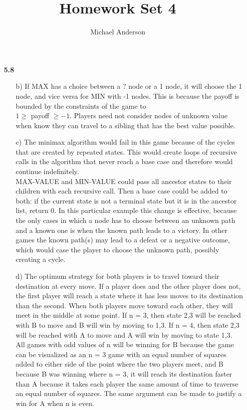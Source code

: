 \documentclass{article}
\author{Michael Anderson}
\title{Homework Set 4}
\begin{document}
\begin{enumerate}
\item[\textbf{5.8}]

\begin{enumerate}
\item[b)]
If MAX has a choice between a ? node or a 1 node, it will choose the 1 node,
and vice versa for MIN with -1 nodes. This is because the payoff is bounded by
the constraints of the game to \\ $1\ge$ payoff $\ge -1$. Players need not
consider nodes of unknown value when know they can travel to a sibling that has
the best value possible.
\item[c)]
The minimax algorithm would fail in this game because of the cycles that are
created by repeated states. This would create loops of recursive calls in the
algorithm that never reach a base case and therefore would continue
indefinitely. \\

MAX-VALUE and MIN-VALUE could pass all ancestor states to their
children with each recursive call. Then a base case could be added to both: if
the current state is not a terminal state but it is in the ancestor list,
return 0. In this particular example this change is effective, because the only
cases in which a node has to choose between an unknown path and a known one is
when the known path leads to a victory. In other games the known path(s) may
lead to a defeat or a negative outcome, which would case the player to choose
the unknown path, possibly creating a cycle.
\item[d)]
The optimum strategy for both players is to travel toward their destination at
every move. If a player does and the other player does not, the first player
will reach a state where it has less moves to its destination than the second.
When both players move toward each other, they will meet in the middle at some
point. If n = 3, then state 2,3 will be reached with B to move and B will win
by moving to 1,3. If n = 4, then state 2,3 will be reached with A to move and A
will win by moving to state 1,3. All games with odd values of n will be winning
for B because the game can be visualized as an n = 3 game with an equal number
of squares added to either side of the point where the two players meet, and B
because B was winning where n = 3, it will reach its destination faster than A
because it takes each player the same amount of time to traverse an equal number
of squares. The same argument can be made to justify a win for A when n is
even.
\end{enumerate}
\newpage


\end{enumerate}
\end{document}

